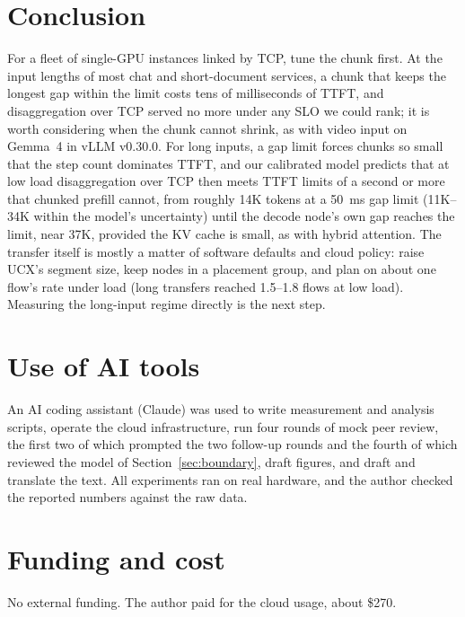 \documentclass[11pt]{article}
\begin{document}
\section{Conclusion}
For a fleet of single-GPU instances linked by TCP, tune the chunk first. At the input lengths of most chat and short-document services, a chunk that keeps the longest gap within the limit costs tens of milliseconds of TTFT, and disaggregation over TCP served no more under any SLO we could rank; it is worth considering when the chunk cannot shrink, as with video input on Gemma~4 in vLLM v0.30.0. For long inputs, a gap limit forces chunks so small that the step count dominates TTFT, and our calibrated model predicts that at low load disaggregation over TCP then meets TTFT limits of a second or more that chunked prefill cannot, from roughly 14K tokens at a 50~ms gap limit (11K--34K within the model's uncertainty) until the decode node's own gap reaches the limit, near 37K, provided the KV cache is small, as with hybrid attention. The transfer itself is mostly a matter of software defaults and cloud policy: raise UCX's segment size, keep nodes in a placement group, and plan on about one flow's rate under load (long transfers reached 1.5--1.8 flows at low load). Measuring the long-input regime directly is the next step.

\section*{Use of AI tools}
An AI coding assistant (Claude) was used to write measurement and analysis scripts, operate the cloud infrastructure, run four rounds of mock peer review, the first two of which prompted the two follow-up rounds and the fourth of which reviewed the model of Section~\ref{sec:boundary}, draft figures, and draft and translate the text. All experiments ran on real hardware, and the author checked the reported numbers against the raw data.

\section*{Funding and cost}
No external funding. The author paid for the cloud usage, about \$270.




\clearpage
\appendix
\setcounter{figure}{0}
\renewcommand{\thefigure}{A\arabic{figure}}
\renewcommand{\thetable}{\thesection\arabic{table}}
\end{document}
